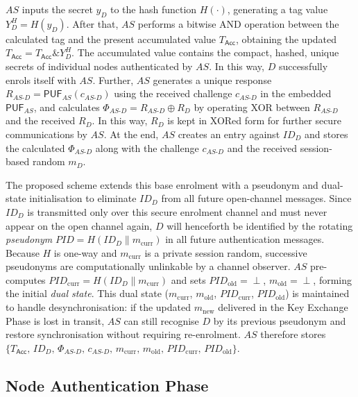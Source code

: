 \documentclass[conference]{IEEEtran}
\begin{document}
$AS$ inputs the secret $y_D$ to the hash function $H(\cdot)$, generating a tag
value $Y_D^H = H(y_D)$.  After that, $AS$ performs a bitwise AND operation
between the calculated tag and the present accumulated value $T_\mathsf{Acc}$,
obtaining the updated $T_\mathsf{Acc} = T_\mathsf{Acc} \mathbin{\&} Y_D^H$.
The accumulated value contains the compact, hashed, unique secrets of individual
nodes authenticated by $AS$.  In this way, $D$ successfully enrols itself with
$AS$.  Further, $AS$ generates a unique response
$R_{AS\text{-}D} = \mathsf{PUF}_{AS}(c_{AS\text{-}D})$ using the received
challenge $c_{AS\text{-}D}$ in the embedded $\mathsf{PUF}_{AS}$, and calculates
$\Phi_{AS\text{-}D} = R_{AS\text{-}D} \oplus R_D$ by operating XOR between
$R_{AS\text{-}D}$ and the received $R_D$.  In this way, $R_D$ is kept in XORed
form for further secure communications by $AS$.  At the end, $AS$ creates an
entry against $ID_D$ and stores the calculated $\Phi_{AS\text{-}D}$ along with
the challenge $c_{AS\text{-}D}$ and the received session-based random $m_D$.

The proposed scheme extends this base enrolment with a pseudonym and dual-state
initialisation to eliminate $ID_D$ from all future open-channel messages.  Since
$ID_D$ is transmitted only over this secure enrolment channel and must never
appear on the open channel again, $D$ will henceforth be identified by the
rotating \emph{pseudonym} $\mathit{PID} = H(ID_D \| m_{\mathrm{curr}})$ in all
future authentication messages.  Because $H$ is one-way and $m_{\mathrm{curr}}$
is a private session random, successive pseudonyms are computationally unlinkable
by a channel observer.  $AS$ pre-computes
$\mathit{PID}_{\mathrm{curr}} = H(ID_D \| m_{\mathrm{curr}})$ and sets
$\mathit{PID}_{\mathrm{old}} = \perp$, $m_{\mathrm{old}} = \perp$, forming the
initial \emph{dual state}.  This dual state
($m_{\mathrm{curr}}$, $m_{\mathrm{old}}$, $\mathit{PID}_{\mathrm{curr}}$,
$\mathit{PID}_{\mathrm{old}}$) is maintained to handle desynchronisation: if the
updated $m_{\mathrm{new}}$ delivered in the Key Exchange Phase is lost in
transit, $AS$ can still recognise $D$ by its previous pseudonym and restore
synchronisation without requiring re-enrolment.  $AS$ therefore stores
$\{T_\mathsf{Acc},\, ID_D,\, \Phi_{AS\text{-}D},\, c_{AS\text{-}D},\,
m_{\mathrm{curr}},\, m_{\mathrm{old}},\, \mathit{PID}_{\mathrm{curr}},\,
\mathit{PID}_{\mathrm{old}}\}$.

\subsection{Node Authentication Phase}
\end{document}
